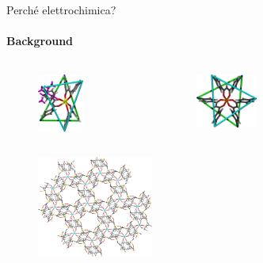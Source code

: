 \documentclass[aspectration=169]{beamer}
\begin{document}
\begin{frame}{Perché elettrochimica?}
	\framesubtitle{Background}
	\begin{columns}
		\begin{column}{0.5\textwidth}
			\begin{columns}
				\begin{column}{0.5\textwidth}
					\begin{figure}[h!]
						\centering
						\includegraphics[width=1.5cm,keepaspectratio]{illustration/monomero2.png}
					\end{figure}
					\vspace*{-0.5cm}
				\end{column}
				\hspace{-2cm}
				\begin{column}{0.5\textwidth}
					\begin{figure}[h!]
						\centering
						\includegraphics[width=2cm,keepaspectratio]{illustration/monomero1.png}
					\end{figure}
				\end{column}
			\end{columns}
			\begin{figure}[h!]
				\centering
				\includegraphics[width=3.8cm,keepaspectratio]{illustration/mof.png}
			\end{figure}
			\vspace*{-1cm}
			\hspace{-1cm}
		\end{column}
		\vspace{-4cm}
		\begin{column}{0.5\textwidth}

\end{column}
\end{columns}
\end{frame}
\end{document}
